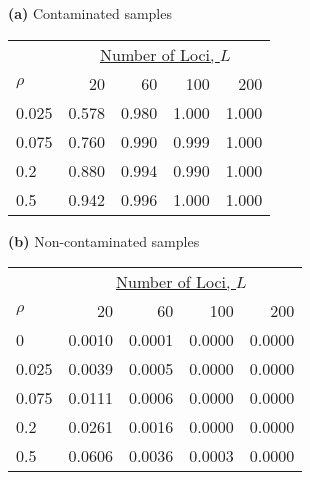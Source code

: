 {\bf (a)} Contaminated samples 
\begin{center}
\begin{tabular}{lrrrr} 
  &  \multicolumn{4}{c}{\underline{Number of Loci, $L$}} \\
$\rho~~~~~~~$  &  20              &  60              &  100             &  200             \\  
\hline 0.025   &  0.578           &  0.980           &  1.000           &  1.000           \\  
0.075           &  0.760           &  0.990           &  0.999           &  1.000           \\  
0.2             &  0.880           &  0.994           &  0.990           &  1.000           \\  
0.5             &  0.942           &  0.996           &  1.000           &  1.000           \\  
\end{tabular} 
\end{center}
{\bf (b)} Non-contaminated samples 
\begin{center}
\begin{tabular}{lrrrr} 
  &  \multicolumn{4}{c}{\underline{Number of Loci, $L$}} \\
$\rho~~~~~~~$  &  20              &  60              &  100             &  200             \\  
\hline 0       &  0.0010          &  0.0001          &  0.0000          &  0.0000          \\  
0.025           &  0.0039          &  0.0005          &  0.0000          &  0.0000          \\  
0.075           &  0.0111          &  0.0006          &  0.0000          &  0.0000          \\  
0.2             &  0.0261          &  0.0016          &  0.0000          &  0.0000          \\  
0.5             &  0.0606          &  0.0036          &  0.0003          &  0.0000          \\  
\end{tabular} 
\end{center}
